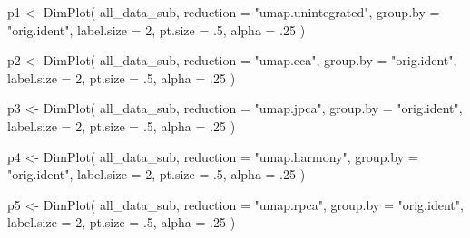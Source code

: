 \documentclass[
  letterpaper,
  DIV=11,
  numbers=noendperiod]{scrreprt}
\newenvironment{Shaded}{\begin{snugshade}}{\end{snugshade}}
\newcommand{\AttributeTok}[1]{\textcolor[rgb]{0.40,0.45,0.13}{#1}}
\newcommand{\DecValTok}[1]{\textcolor[rgb]{0.68,0.00,0.00}{#1}}
\newcommand{\FunctionTok}[1]{\textcolor[rgb]{0.28,0.35,0.67}{#1}}
\newcommand{\NormalTok}[1]{\textcolor[rgb]{0.00,0.23,0.31}{#1}}
\newcommand{\OtherTok}[1]{\textcolor[rgb]{0.00,0.23,0.31}{#1}}
\newcommand{\StringTok}[1]{\textcolor[rgb]{0.13,0.47,0.30}{#1}}
\begin{document}
\begin{Shaded}
\begin{Highlighting}[]
\NormalTok{p1 }\OtherTok{\textless{}{-}} \FunctionTok{DimPlot}\NormalTok{(}
\NormalTok{  all\_data\_sub,}
  \AttributeTok{reduction =} \StringTok{"umap.unintegrated"}\NormalTok{,}
  \AttributeTok{group.by =} \StringTok{"orig.ident"}\NormalTok{,  }
  \AttributeTok{label.size =} \DecValTok{2}\NormalTok{,}
  \AttributeTok{pt.size =}\NormalTok{ .}\DecValTok{5}\NormalTok{,}
  \AttributeTok{alpha =}\NormalTok{ .}\DecValTok{25}
\NormalTok{)}

\NormalTok{p2 }\OtherTok{\textless{}{-}} \FunctionTok{DimPlot}\NormalTok{(}
\NormalTok{  all\_data\_sub,}
  \AttributeTok{reduction =} \StringTok{"umap.cca"}\NormalTok{,}
  \AttributeTok{group.by =} \StringTok{"orig.ident"}\NormalTok{,  }
  \AttributeTok{label.size =} \DecValTok{2}\NormalTok{,}
  \AttributeTok{pt.size =}\NormalTok{ .}\DecValTok{5}\NormalTok{,}
  \AttributeTok{alpha =}\NormalTok{ .}\DecValTok{25}
\NormalTok{)}


\NormalTok{p3 }\OtherTok{\textless{}{-}} \FunctionTok{DimPlot}\NormalTok{(}
\NormalTok{  all\_data\_sub,}
  \AttributeTok{reduction =} \StringTok{"umap.jpca"}\NormalTok{,}
  \AttributeTok{group.by =} \StringTok{"orig.ident"}\NormalTok{,  }
  \AttributeTok{label.size =} \DecValTok{2}\NormalTok{,}
  \AttributeTok{pt.size =}\NormalTok{ .}\DecValTok{5}\NormalTok{,}
  \AttributeTok{alpha =}\NormalTok{ .}\DecValTok{25}
\NormalTok{)}

\NormalTok{p4 }\OtherTok{\textless{}{-}} \FunctionTok{DimPlot}\NormalTok{(}
\NormalTok{  all\_data\_sub,}
  \AttributeTok{reduction =} \StringTok{"umap.harmony"}\NormalTok{,}
  \AttributeTok{group.by =} \StringTok{"orig.ident"}\NormalTok{,  }
  \AttributeTok{label.size =} \DecValTok{2}\NormalTok{,}
  \AttributeTok{pt.size =}\NormalTok{ .}\DecValTok{5}\NormalTok{,}
  \AttributeTok{alpha =}\NormalTok{ .}\DecValTok{25}
\NormalTok{)}


\NormalTok{p5 }\OtherTok{\textless{}{-}} \FunctionTok{DimPlot}\NormalTok{(}
\NormalTok{  all\_data\_sub,}
  \AttributeTok{reduction =} \StringTok{"umap.rpca"}\NormalTok{,}
  \AttributeTok{group.by =} \StringTok{"orig.ident"}\NormalTok{,  }
  \AttributeTok{label.size =} \DecValTok{2}\NormalTok{,}
  \AttributeTok{pt.size =}\NormalTok{ .}\DecValTok{5}\NormalTok{,}
  \AttributeTok{alpha =}\NormalTok{ .}\DecValTok{25}
\NormalTok{)}
\end{Highlighting}
\end{Shaded}
\end{document}
